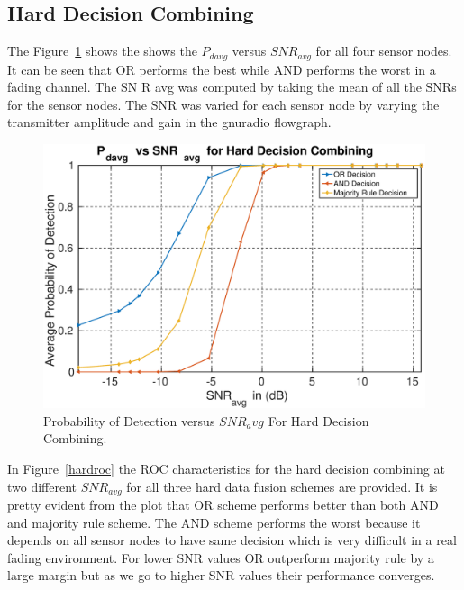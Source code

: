 \subsection{Hard Decision Combining}
The Figure~\ref{hardres} shows the shows the $P_{davg}$ versus $SNR_{avg}$ for all four sensor nodes. It can be seen that OR performs the best while AND performs
the worst in a fading channel. The SN R avg was computed by taking the mean of all the SNRs for the sensor nodes. The SNR
was varied for each sensor node by varying the transmitter amplitude and gain in the gnuradio flowgraph.

\begin{figure}[ht!]
	\centering
	\includegraphics[width=\textwidth,keepaspectratio]{images/Gill/figs/hardecisionpd.eps}
    \caption{Probability of Detection versus $SNR_avg$ For Hard Decision Combining.} 
\label{hardres}      
\end{figure}
In Figure~\ref{hardroc} the ROC characteristics for the hard decision combining at two different $SNR_{avg}$ for all three hard data fusion schemes are provided. It is pretty evident from the plot that OR scheme performs better than both AND and majority rule scheme. The AND scheme performs the worst because it depends on all sensor nodes to have same decision which is very difficult in a real fading environment. For lower SNR values OR outperform majority rule by a large margin but as we go to higher SNR values their performance converges.

